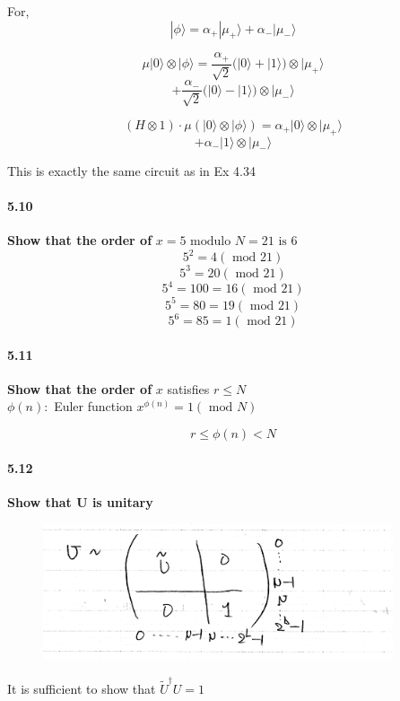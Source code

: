 For,
$$|\phi\rangle = \alpha_{+} |\mu_{+}\rangle + \alpha_{-} |\mu_{-}\rangle $$

$$\mu|0\rangle \otimes |\phi\rangle = \frac{\alpha_+}{\sqrt{2}} \bigg( |0\rangle +|1\rangle \bigg) \otimes |\mu_+\rangle$$
$$ + \frac{\alpha_-}{\sqrt{2}} \bigg( |0\rangle -|1\rangle \bigg) \otimes |\mu_-\rangle $$

$$ (H \otimes 1) \cdot \mu (|0\rangle \otimes |\phi\rangle ) = \alpha_+ |0\rangle \otimes |\mu_+\rangle$$
$$+ \alpha_- |1\rangle \otimes |\mu_-\rangle$$

This is exactly the same circuit as in Ex 4.34


\paragraph{5.10} \textbf{Show that the order of } $x = 5 \text{ modulo } N = 21 \text{ is } 6$
\\

$$5^2 = 4 (\text{ mod } 21)$$
$$ 5^3 = 20( \text{ mod } 21)$$
$$ 5^4 = 100 = 16 (\text{ mod } 21)$$
$$ 5^5 = 80 = 19(\text{ mod } 21)$$
$$ 5^6 = 85 = 1(\text{ mod } 21)$$

\paragraph{5.11} \textbf{Show that the order of } $x$ satisfies $ r\le N$
\\

$\phi(n) :$  Euler function $ x^{\phi(n)} = 1 (\text{ mod } N)$

$$ r \le \phi(n) <  N$$

\paragraph{5.12} \textbf{Show that U is unitary}
\\
\begin{figure}[h!]
    \centering
    \includegraphics{Chapter 5/5.12.png}
    
    \label{fig:my_label}
\end{figure}
It is sufficient to show that $\tilde{U}^{\dagger} U = 1$

